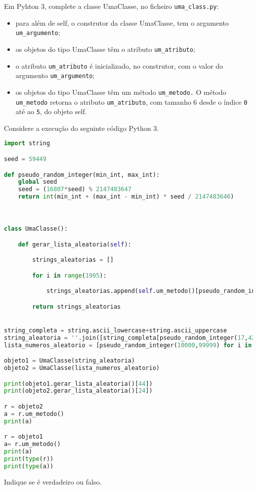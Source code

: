 \documentclass[12pt,varwidth=16cm,border=17pt]{standalone}
\begin{document}
Em Pyhton 3, complete a classe UmaClasse, no ficheiro \verb+uma_class.py+:

\begin{itemize}
  \item para além de self, o construtor da classe UmaClasse, tem o argumento \verb+um_argumento+;
  \item os objetos do tipo UmaClasse têm o atributo \verb+um_atributo+;
  \item o atributo \verb+um_atributo+ é inicializado, no construtor, com o valor
do argumento \verb+um_argumento+;
  \item os objetos do tipo UmaClasse têm um método \verb+um_metodo.+ O
    método \verb+um_metodo+ retorna o atributo \verb+um_atributo+, com tamanho 6 desde o índice \verb+0+ até ao \verb+5+, do objeto self.
\end{itemize}

Considere a execução do seguinte código Python 3.



\begin{lstlisting}[language=Python]
import string

seed = 59449

def pseudo_random_integer(min_int, max_int):
    global seed
    seed = (16807*seed) % 2147483647
    return int(min_int + (max_int - min_int) * seed / 2147483646)



class UmaClasse():

	def gerar_lista_aleatoria(self):

		strings_aleatorias = []

		for i in range(1995):

			strings_aleatorias.append(self.um_metodo()[pseudo_random_integer(0, 5)])

		return strings_aleatorias


string_completa = string.ascii_lowercase+string.ascii_uppercase
string_aleatoria = ''.join([string_completa[pseudo_random_integer(17,42)] for i in range(1995)])
lista_numeros_aleatorio = [pseudo_random_integer(10000,99999) for i in range(1995)]

objeto1 = UmaClasse(string_aleatoria)
objeto2 = UmaClasse(lista_numeros_aleatorio)

print(objeto1.gerar_lista_aleatoria()[44])
print(objeto2.gerar_lista_aleatoria()[24])

r = objeto2
a = r.um_metodo()
print(a)

r = objeto1
a= r.um_metodo()
print(a)
print(type(r))
print(type(a))
\end{lstlisting}

Indique se é verdadeiro ou falso.
\end{document}
